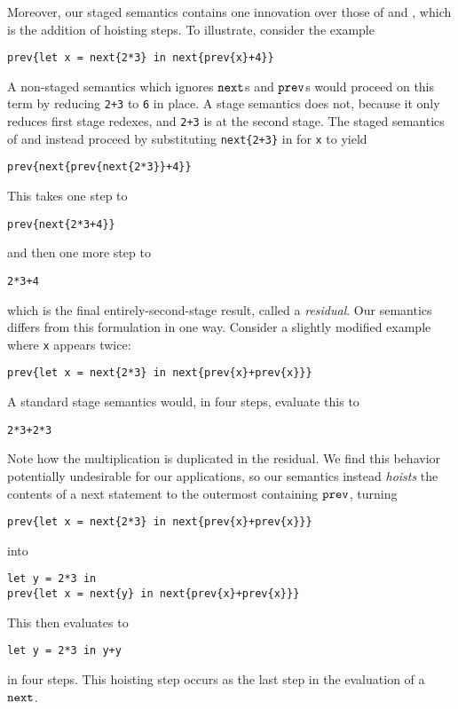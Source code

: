 Moreover, our staged semantics contains one innovation over those of 
\cite{davies96} and \cite{taha-thesis-99}, which is the addition
of hoisting steps.  
To illustrate, consider the example
\begin{lstlisting}
prev{let x = next{2*3} in next{prev{x}+4}}
\end{lstlisting}
A non-staged semantics which ignores ${\tt next}$s and ${\tt prev}$s
would proceed on this term by reducing \verb|2+3| to \verb|6| in place.
A stage semantics does not, because it only reduces first stage redexes, and
\verb|2+3| is at the second stage.  
The staged semantics of \cite{davies96} and \cite{taha-thesis-99} instead proceed by
substituting \verb|next{2+3}| in for \verb|x| to yield
\begin{lstlisting}
prev{next{prev{next{2*3}}+4}}
\end{lstlisting}
This takes one step to 
\begin{lstlisting}
prev{next{2*3+4}}
\end{lstlisting}
and then one more step to
\begin{lstlisting}
2*3+4
\end{lstlisting}
which is the final entirely-second-stage result, called a {\em residual}.
Our semantics differs from this formulation in one way.
Consider a slightly modified example where \verb|x| appears twice:
\begin{lstlisting}
prev{let x = next{2*3} in next{prev{x}+prev{x}}}
\end{lstlisting}
A standard stage semantics would, in four steps, evaluate this to 
\begin{lstlisting}
2*3+2*3
\end{lstlisting}
Note how the multiplication is duplicated in the residual.
We find this behavior potentially undesirable for our applications,
so our semantics instead {\em hoists} the contents of a next statement 
to the outermost containing ${\tt prev}$, turning
\begin{lstlisting}
prev{let x = next{2*3} in next{prev{x}+prev{x}}}
\end{lstlisting}
into
\begin{lstlisting}
let y = 2*3 in
prev{let x = next{y} in next{prev{x}+prev{x}}}
\end{lstlisting}
This then evaluates to 
\begin{lstlisting}
let y = 2*3 in y+y
\end{lstlisting}
in four steps.  
This hoisting step occurs as the last step in the evaluation of a ${\tt next}$.

